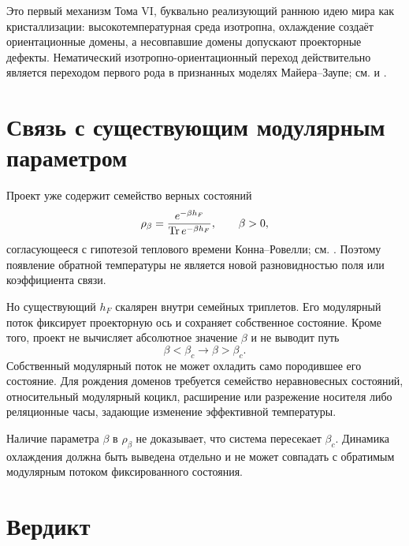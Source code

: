 Это первый механизм Тома VI, буквально реализующий раннюю идею мира как
кристаллизации: высокотемпературная среда изотропна, охлаждение создаёт
ориентационные домены, а несовпавшие домены допускают проекторные дефекты.
Нематический изотропно-ориентационный переход действительно является
переходом первого рода в признанных моделях Майера--Заупе; см.
 и
.

\section{Связь с существующим модулярным параметром}

Проект уже содержит семейство верных состояний
\begin{equation}
 \rho_\beta=\frac{e^{-\beta h_F}}{\operatorname{Tr} e^{-\beta h_F}},
 \qquad \beta>0,
\end{equation}
согласующееся с гипотезой теплового времени Конна--Ровелли; см.
. Поэтому появление обратной температуры не
является новой разновидностью поля или коэффициента связи.

Но существующий $h_F$ скалярен внутри семейных триплетов. Его модулярный
поток фиксирует проекторную ось и сохраняет собственное состояние. Кроме
того, проект не вычисляет абсолютное значение $\beta$ и не выводит путь
\begin{equation}
 \beta<\beta_c\longrightarrow\beta>\beta_c.
\end{equation}
Собственный модулярный поток не может охладить само породившее его
состояние. Для рождения доменов требуется семейство неравновесных состояний,
относительный модулярный коцикл, расширение или разрежение носителя либо
реляционные часы, задающие изменение эффективной температуры.

\begin{nogocriterion}
Наличие параметра $\beta$ в $\rho_\beta$ не доказывает, что система
пересекает $\beta_c$. Динамика охлаждения должна быть выведена отдельно и
не может совпадать с обратимым модулярным потоком фиксированного состояния.
\end{nogocriterion}

\section{Вердикт}


